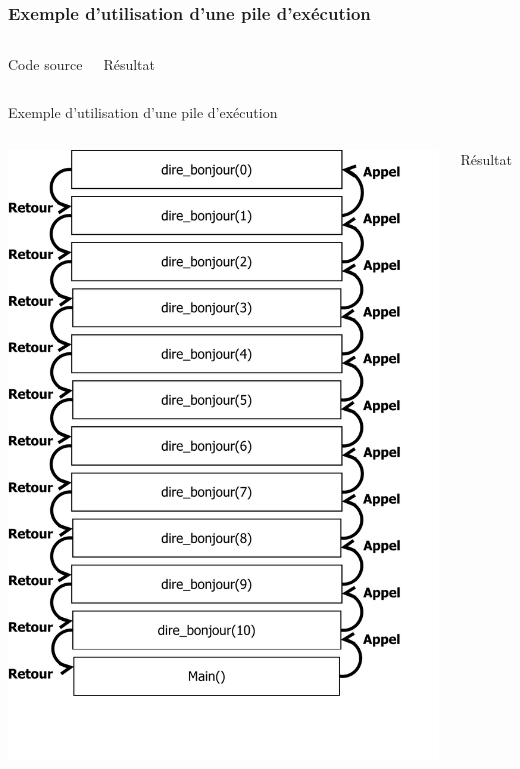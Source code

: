 \begin{frame}
\frametitle{Exemple d'utilisation d'une pile d'exécution}
\begin{columns}
\begin{block}{Code source}
\tiny{}
\end{block}
\begin{exampleblock}{Résultat}
\tiny{}
\end{exampleblock}
\end{columns}
\end{frame}

\begin{frame}{Exemple d'utilisation d'une pile d'exécution}
\begin{columns}
\includegraphics[height=\textheight]{../illustration/PileAppel.pdf}
\begin{exampleblock}{Résultat}
\tiny{}
\end{exampleblock}
\end{columns}
\end{frame}






